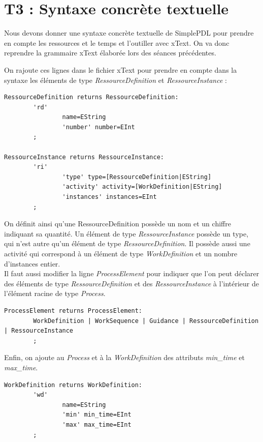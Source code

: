 \documentclass{report}
\begin{document}
\newpage

\section{T3 : Syntaxe concrète textuelle}

Nous devons donner une syntaxe concrète textuelle de SimplePDL pour prendre en compte les ressources et le temps et l’outiller avec xText. On va donc reprendre la grammaire xText élaborée lors des séances précédentes.

On rajoute ces lignes dans le fichier xText pour prendre en compte dans la syntaxe les éléments de type \textit{RessourceDefinition} et \textit{RessourceInstance} :\\

\begin{verbatim}
RessourceDefinition returns RessourceDefinition:
        'rd'
                name=EString
                'number' number=EInt
        ;

RessourceInstance returns RessourceInstance:
        'ri'
                'type' type=[RessourceDefinition|EString]
                'activity' activity=[WorkDefinition|EString]
                'instances' instances=EInt
        ;
\end{verbatim}

On définit ainsi qu'une RessourceDefinition possède un nom et un chiffre indiquant sa quantité. Un élément de type \textit{RessourceInstance} possède un type, qui n'est autre qu'un élément de type \textit{RessourceDefinition}.
Il possède aussi une activité qui correspond à un élément de type \textit{WorkDefinition} et un nombre d'instances entier.\\

Il faut aussi modifier la ligne \textit{ProcessElement} pour indiquer que l'on peut déclarer des éléments de type \textit{RessourceDefinition} et des \textit{RessourceInstance} à l'intérieur de l'élément racine de type \textit{Process}.

\begin{verbatim}
ProcessElement returns ProcessElement:
        WorkDefinition | WorkSequence | Guidance | RessourceDefinition | RessourceInstance
        ;
\end{verbatim}

Enfin, on ajoute au \textit{Process} et à la \textit{WorkDefinition} des attributs \textit{min\_time} et \textit{max\_time}.

\begin{verbatim}
WorkDefinition returns WorkDefinition:
        'wd'
                name=EString
                'min' min_time=EInt
                'max' max_time=EInt
        ;
\end{verbatim}
\end{document}
